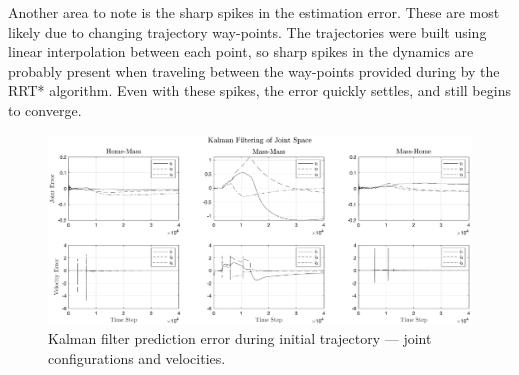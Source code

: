 Another area to note is the sharp spikes in the estimation error.
These are most likely due to changing trajectory way-points.
The trajectories were built using linear interpolation between each point, so sharp spikes in the dynamics are probably present when traveling between the way-points provided during by the RRT* algorithm.
Even with these spikes, the error quickly settles, and still begins to converge.

\begin{figure}[H]
  \centering
  \includegraphics[width=\textwidth]{figures/kf_error.eps}
  \caption{Kalman filter prediction error during initial trajectory --- joint configurations and velocities.}
  \label{fig:kferror}
\end{figure}
